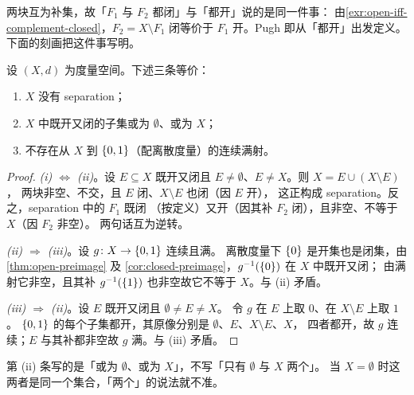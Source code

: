 \begin{remark}
  两块互为补集，故「\(F_{1}\) 与 \(F_{2}\) 都闭」与「都开」说的是同一件事：
  由\cref{exr:open-iff-complement-closed}，\(F_{2} = X \setminus F_{1}\) 闭等价于
  \(F_{1}\) 开。Pugh 即从「都开」出发定义。
  下面的刻画把这件事写明。
\end{remark}

\begin{proposition}[连通的三条刻画]
  \label{prop:connected-equiv}
  设 \((X,d)\) 为度量空间。下述三条等价：
  \begin{enumerate}[label=(\roman*)]
    \item \(X\) 没有 separation；
    \item \(X\) 中既开又闭的子集或为 \(\emptyset\)、或为 \(X\)；
    \item 不存在从 \(X\) 到 \(\left\{0,1\right\}\)（配离散度量）的连续满射。
  \end{enumerate}
\end{proposition}

\begin{proof}
  \emph{(i) \(\Leftrightarrow\) (ii)}。设 \(E \subseteq X\) 既开又闭且
  \(E \neq \emptyset\)、\(E \neq X\)。则 \(X = E \cup (X \setminus E)\)，
  两块非空、不交，且 \(E\) 闭、\(X \setminus E\) 也闭（因 \(E\) 开），
  这正构成 separation。反之，separation 中的 \(F_{1}\) 既闭
  （按定义）又开（因其补 \(F_{2}\) 闭），且非空、不等于 \(X\)（因 \(F_{2}\) 非空）。
  两句话互为逆转。

  \emph{(ii) \(\Rightarrow\) (iii)}。设 \(g \colon X \to \left\{0,1\right\}\) 连续且满。
  离散度量下 \(\left\{0\right\}\) 是开集也是闭集，由\cref{thm:open-preimage} 及%
  \cref{cor:closed-preimage}，\(g^{-1}(\left\{0\right\})\) 在 \(X\) 中既开又闭；
  由满射它非空，且其补 \(g^{-1}(\left\{1\right\})\) 也非空故它不等于 \(X\)。与 (ii) 矛盾。

  \emph{(iii) \(\Rightarrow\) (ii)}。设 \(E\) 既开又闭且 \(\emptyset \neq E \neq X\)。
  令 \(g\) 在 \(E\) 上取 \(0\)、在 \(X \setminus E\) 上取 \(1\)。
  \(\left\{0,1\right\}\) 的每个子集都开，其原像分别是 \(\emptyset\)、\(E\)、\(X \setminus E\)、\(X\)，
  四者都开，故 \(g\) 连续；\(E\) 与其补都非空故 \(g\) 满。与 (iii) 矛盾。
\end{proof}

\begin{remark}
  第 (ii) 条写的是「或为 \(\emptyset\)、或为 \(X\)」，不写「只有 \(\emptyset\) 与 \(X\) 两个」。
  当 \(X = \emptyset\) 时这两者是同一个集合，「两个」的说法就不准。
\end{remark}

